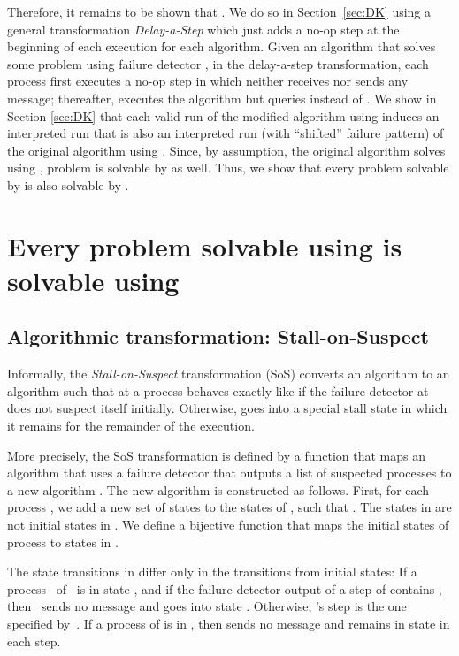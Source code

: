 \documentclass[11pt]{article}
\begin{document}
Therefore, it remains to be shown that .
We do so in Section~\ref{sec:DK} using a general transformation
     \emph{Delay-a-Step} which just adds a no-op step at the beginning
     of each execution for each algorithm.
Given an algorithm  that solves some problem  using
     failure detector , in the delay-a-step transformation,
     each process  first executes a no-op step in which 
     neither receives nor sends any message; thereafter, 
     executes the algorithm  but queries  instead of
     .
We show in Section \ref{sec:DK} that each valid run of the modified
     algorithm using  induces an interpreted run that is
     also an interpreted run (with ``shifted'' failure pattern) of the
     original algorithm using .
Since, by assumption, the original algorithm solves  using
     , problem  is solvable by  as well.
Thus, we show that every problem solvable by  is also solvable
     by .




\section{Every problem solvable using  is solvable using }
\label{sec:MP}

\subsection{Algorithmic transformation: Stall-on-Suspect}
\label{subsec:algTrans}

Informally, the \emph{Stall-on-Suspect} transformation (SoS) converts
     an algorithm  to an algorithm  such that 
     at a process  behaves exactly like  if the failure
     detector at  does not suspect itself initially.
Otherwise,  goes into a special stall state in which it
     remains for the remainder of the execution.
 
More precisely, the SoS transformation is defined by a function
      that maps an algorithm  that uses a failure detector that
     outputs a list of suspected processes to a new algorithm .
The new algorithm  is constructed as follows.
First, for each process , we add a new set of states
      to the states of , such that .
The states in  are not initial states in .
We define a bijective function  that maps the initial states of process
      to states in .


The state transitions in  differ only in the transitions
from initial states:
If a process~ of~ is in state , and if
     the failure detector output of a step of  contains ,
     then~ sends no message and goes into state
     .
Otherwise, 's step is the one specified by~.
If a process  of  is in , then 
     sends no message and remains in state  in each step.
\end{document}
